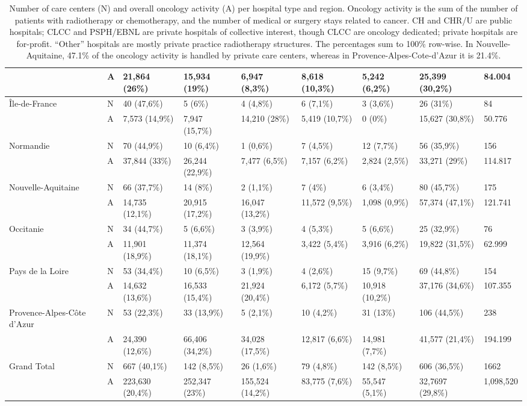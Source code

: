 \begin{table}[!ht]
{\begin{tabular}{|l|l|l|l|l|l|l|l|l|}
        ~ & A & 21,864 (26\%) & 15,934 (19\%) & 6,947 (8,3\%) & 8,618 (10,3\%) & 5,242 (6,2\%) & 25,399 (30,2\%) & 84.004 \\ \hline
        Île-de-France & N & 40 (47,6\%) & 5 (6\%) & 4 (4,8\%) & 6 (7,1\%) & 3 (3,6\%) & 26 (31\%) & 84 \\
        ~ & A & 7,573 (14,9\%) & 7,947 (15,7\%) & 14,210 (28\%) & 5,419 (10,7\%) & 0 (0\%) & 15,627 (30,8\%) & 50.776 \\ \hline
        Normandie & N & 70 (44,9\%) & 10 (6,4\%) & 1 (0,6\%) & 7 (4,5\%) & 12 (7,7\%) & 56 (35,9\%) & 156 \\
        ~ & A & 37,844 (33\%) & 26,244 (22,9\%) & 7,477 (6,5\%) & 7,157 (6,2\%) & 2,824 (2,5\%) & 33,271 (29\%) & 114.817 \\ \hline
        Nouvelle-Aquitaine & N & 66 (37,7\%) & 14 (8\%) & 2 (1,1\%) & 7 (4\%) & 6 (3,4\%) & 80 (45,7\%) & 175 \\
        ~ & A & 14,735 (12,1\%) & 20,915 (17,2\%) & 16,047 (13,2\%) & 11,572 (9,5\%) & 1,098 (0,9\%) & 57,374 (47,1\%) & 121.741 \\ \hline
        Occitanie & N & 34 (44,7\%) & 5 (6,6\%) & 3 (3,9\%) & 4 (5,3\%) & 5 (6,6\%) & 25 (32,9\%) & 76 \\
        ~ & A & 11,901 (18,9\%) & 11,374 (18,1\%) & 12,564 (19,9\%) & 3,422 (5,4\%) & 3,916 (6,2\%) & 19,822 (31,5\%) & 62.999 \\ \hline
        Pays de la Loire & N & 53 (34,4\%) & 10 (6,5\%) & 3 (1,9\%) & 4 (2,6\%) & 15 (9,7\%) & 69 (44,8\%) & 154 \\
        ~ & A & 14,632 (13,6\%) & 16,533 (15,4\%) & 21,924 (20,4\%) & 6,172 (5,7\%) & 10,918 (10,2\%) & 37,176 (34,6\%) & 107.355 \\ \hline
        Provence-Alpes-Côte d'Azur & N & 53 (22,3\%) & 33 (13,9\%) & 5 (2,1\%) & 10 (4,2\%) & 31 (13\%) & 106 (44,5\%) & 238 \\
        ~ & A & 24,390 (12,6\%) & 66,406 (34,2\%) & 34,028 (17,5\%) & 12,817 (6,6\%) & 14,981 (7,7\%) & 41,577 (21,4\%) & 194.199 \\ \hline
        Grand Total & N & 667 (40,1\%) & 142 (8,5\%) & 26 (1,6\%) & 79 (4,8\%) & 142 (8,5\%) & 606 (36,5\%) & 1662 \\
        ~ & A & 223,630 (20,4\%) & 252,347 (23\%) & 155,524 (14,2\%) & 83,775 (7,6\%) & 55,547 (5,1\%) & 32,7697 (29,8\%) & 1,098,520 \\ \hline
    \end{tabular}}
    \caption{
        Number of care centers (N) and overall oncology activity (A) per hospital type and region. Oncology activity is the sum of the number of patients with radiotherapy or chemotherapy, and the number of medical or surgery stays related to cancer. CH and CHR/U are public hospitals; CLCC and PSPH/EBNL are private hospitals of collective interest, though CLCC are oncology dedicated; private hospitals are for-profit. “Other” hospitals are mostly private practice radiotherapy structures. The percentages sum to 100\% row-wise. In Nouvelle-Aquitaine, 47.1\% of the oncology activity is handled by private care centers, whereas in Provence-Alpes-Cote-d’Azur it is 21.4\%.
}
\end{table}
